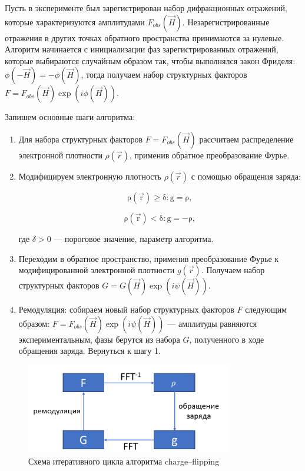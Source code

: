 Пусть в эксперименте был зарегистрирован набор дифракционных отражений, которые характеризуются амплитудами $F_{obs}(\overrightarrow{H})$. Незарегистрированные отражения в других точках обратного пространства принимаются за нулевые. Алгоритм начинается с инициализации фаз зарегистрированных отражений, которые выбираются случайным образом так, чтобы выполнялся закон Фриделя: $\phi(-\overrightarrow{H}) = -\phi(\overrightarrow{H})$, тогда получаем набор структурных факторов $F = F_{obs}(\overrightarrow{H})\exp(i\phi(\overrightarrow{H}))$.

Запишем основные шаги алгоритма:

\begin{enumerate}
	\item Для набора структурных факторов $F = F_{obs}(\overrightarrow{H})$ рассчитаем распределение электронной плотности $\rho(\overrightarrow{r})$, применив обратное преобразование Фурье.
	\item Модифицируем электронную плотность $\rho(\overrightarrow{r})$ с помощью обращения заряда:
	
	\begin{equation}
		\mathrm{\rho(\overrightarrow{r})\geq \delta: g = \rho,}
	\end{equation}
	
	\begin{equation}
	\mathrm{\rho(\overrightarrow{r})<\delta: g = -\rho,}
	\end{equation}
		
	где $\delta > 0$ --- пороговое значение, параметр алгоритма.
	\item Переходим в обратное пространство, применив преобразование Фурье к модифицированной электронной плотности $g(\overrightarrow{r})$. Получаем набор структурных факторов $G = G(\overrightarrow{H})\exp(i\psi(\overrightarrow{H}))$.
	\item Ремодуляция: собираем новый набор структурных факторов $F$ следующим образом: $F = F_{obs}(\overrightarrow{H})\exp(i\psi(\overrightarrow{H}))$ --- амплитуды равняются экспериментальным, фазы берутся из набора $G$, полученного в ходе обращения заряда. Вернуться к шагу 1.
\end{enumerate}

\begin{figure}[H]
	\centering
	\includegraphics[width=0.8\textwidth]{figures/charge-flip.png}\hfill
	\caption{Схема итеративного цикла алгоритма charge--flipping}
	\label{chfl}
\end{figure}

